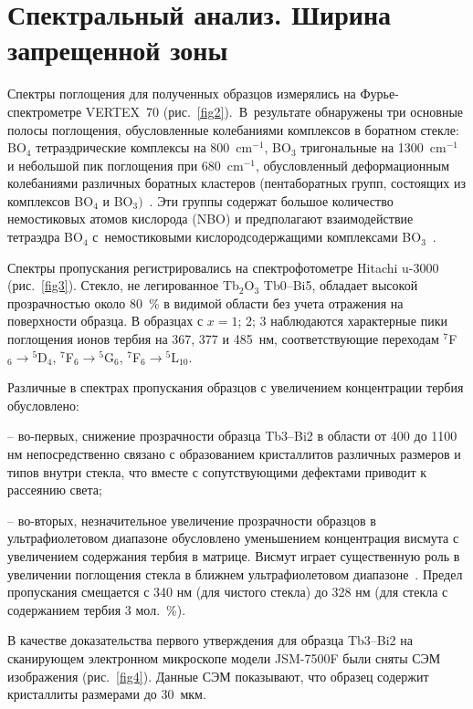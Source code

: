 \documentclass[press]{vestnik}
\begin{document}
\section{Спектральный анализ. Ширина запрещенной зоны}

Спектры поглощения для полученных образцов измерялись на Фурье-спектрометре \linebreak 
VERTEX~70 (рис.~\ref{fig2}).~В~результате обнаружены три основные полосы поглощения, 
обусловленные колебаниями комплексов в боратном стекле: BO$_{4}$ 
тетраэдрические комплексы на 800~cm$^{-1}$, BO$_{3}$ тригональные на 1300~cm$^{-1}$ и небольшой пик поглощения при 680~cm$^{-1}$, обусловленный 
деформационным колебаниями различных боратных кластеров (пентаборатных 
групп, состоящих из комплексов BO$_{4}$ и BO$_{3})$~\cite{B09,B10,B11,B12,B13}. Эти группы 
содержат большое количество немостиковых атомов кислорода (NBO) и 
предполагают взаимодействие тетраэдра BO$_{4}$ с~немостиковыми 
кислородсодержащими комплексами BO$_{3}$~\cite{B09}.

Спектры пропускания регистрировались на спектрофотометре Hitachi u-3000 
(рис.~\ref{fig3}). Стекло, не легированное Tb$_{2}$O$_{3}$ Tb0--Bi5, обладает высокой 
прозрачностью около 80~{\%} в видимой области без учета отражения на 
поверхности образца. В образцах с $x= 1$; 2; 3 наблюдаются характерные пики 
поглощения ионов тербия на 367, 377 и 485~нм, соответствующие переходам 
$^{7}$F$_{6} \to {}^{5}$D$_{4}$, $^{7}$F$_{6} \to {}^{5}$G$_{6}$, 
$^{7}$F$_{6} \to {}^{5}$L$_{10}$.

Различные в спектрах пропускания образцов с увеличением концентрации тербия 
обусловлено:

-- во-первых, снижение прозрачности образца Tb3--Bi2 в области от 400 до 1100 нм 
непосредственно связано с образованием кристаллитов различных размеров и 
типов внутри стекла, что вместе с сопутствующими дефектами приводит к 
рассеянию света;

-- во-вторых, незначительное увеличение прозрачности образцов в 
ультрафиолетовом диапазоне обусловлено уменьшением концентрация висмута с 
увеличением содержания тербия в матрице. Висмут играет существенную роль в 
увеличении поглощения стекла в ближнем ультрафиолетовом диапазоне~\cite{B07,B14}. 
Предел пропускания смещается с 340 нм (для чистого стекла) до 328 нм (для 
стекла с содержанием тербия 3 мол.~{\%}).

В качестве доказательства первого утверждения для образца Tb3--Bi2 на 
сканирующем электронном микроскопе модели JSM-7500F были сняты СЭМ 
изображения (рис.~\ref{fig4}). Данные СЭМ показывают, что образец содержит кристаллиты 
размерами до 30~мкм.
\end{document}
